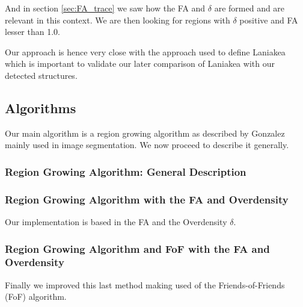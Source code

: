 \documentclass[12pt]{article}
\begin{document}
\begin{par}
And in section \ref{sec:FA_trace} we saw how the
 FA and $\delta$ are formed and are relevant in
  this context. 
We are then looking for regions with $\delta$
 positive and FA lesser than 1.0.
\end{par}

\begin{par}
Our approach is hence very close with the approach
 used to define Laniakea
  \cite{tully_laniakea_2014} which is important to
   validate our later comparison of Laniakea with
    our detected structures.
\end{par}

\subsection{Algorithms}

Our main algorithm is a region growing algorithm
 as described by Gonzalez
  \cite{gonzalez_digital_2008} mainly used in
   image segmentation. We now proceed to describe
    it generally.

\subsubsection{Region Growing Algorithm: General Description}








\subsubsection{Region Growing Algorithm with the FA and Overdensity}
Our implementation is based in the FA and the Overdensity $\delta$.

\subsubsection{Region Growing Algorithm and FoF with the FA and Overdensity}
Finally we improved this last method making used of the Friends-of-Friends (FoF) algorithm.
\end{document}
